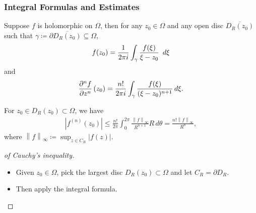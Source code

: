 \hypertarget{integral-formulas-and-estimates}{%
\subsubsection{Integral Formulas and
Estimates}\label{integral-formulas-and-estimates}}

\begin{theorem}\label{CauchyIntegral}

Suppose \(f\) is holomorphic on \(\Omega\), then for any
\(z_0 \in \Omega\) and any open disc \(\overline{D_R(z_0)}\) such that
\(\gamma \coloneqq{{\partial}}\overline{D_R(z_0)} \subseteq \Omega\),
\begin{align*}
f(z_0) = {1 \over 2\pi i} \int_{\gamma} {f(\xi) \over \xi-z_0}\ \,d\xi
\end{align*}
and
\begin{align*}
{\frac{\partial ^nf }{\partial z^n}\,}(z_0) = {n! \over 2\pi i} \int_{\gamma} {f(\xi) \over (\xi - z_0)^{n+1}} \,d\xi
.\end{align*}

\end{theorem}

\begin{theorem}\label{CauchyInequality}

For \(z_0 \in D_R(z_0) \subset \Omega\), we have
\begin{align*}
{\left\lvert { f^{(n)} (z_0) } \right\rvert} 
\leq \frac{n !}{2 \pi} \int_{0}^{2 \pi} \frac{ {\left\lVert {f} \right\rVert}_{\infty} } {R^{n+1}} R \,d\theta
= \frac{n !{\left\lVert {f} \right\rVert}_{\infty}}{R^n} 
,\end{align*}
where
\({\left\lVert {f} \right\rVert}_{\infty}\coloneqq\sup_{z\in C_R} {\left\lvert {f(z)} \right\rvert}\).

\end{theorem}

\begin{proof}[of Cauchy's inequality]

\envlist

\begin{itemize}
\tightlist
\item
  Given \(z_0\in \Omega\), pick the largest disc
  \(D_R(z_0) \subset \Omega\) and let \(C_R = {{\partial}}D_R\).
\item
  Then apply the integral formula.
\end{itemize}

\end{proof}

